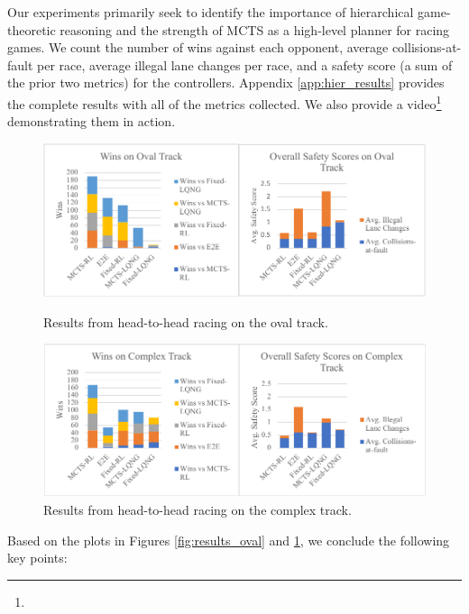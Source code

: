 Our experiments primarily seek to identify the importance of hierarchical game-theoretic reasoning and the strength of MCTS as a high-level planner for racing games. We count the number of wins against each opponent, average collisions-at-fault per race, average illegal lane changes per race, and a safety score (a sum of the prior two metrics) for the controllers. Appendix \ref{app:hier_results} provides the complete results with all of the metrics collected. We also provide a video\footnote{\vidurl} demonstrating them in action. 
\begin{figure} [H]
  \centering
  \includegraphics[width=\textwidth]{Figures/OvalResultsNew2.pdf}
  \caption{Results from head-to-head racing on the oval track.}
  \label{fig:results_oval}
  \bigskip
  \includegraphics[width=\textwidth]{Figures/ComplexResultsNew2.pdf}
  \caption{Results from head-to-head racing on the complex track.}
  \label{fig:results_complex}
\end{figure}

Based on the plots in Figures \ref{fig:results_oval} and \ref{fig:results_complex}, we conclude the following key points:

